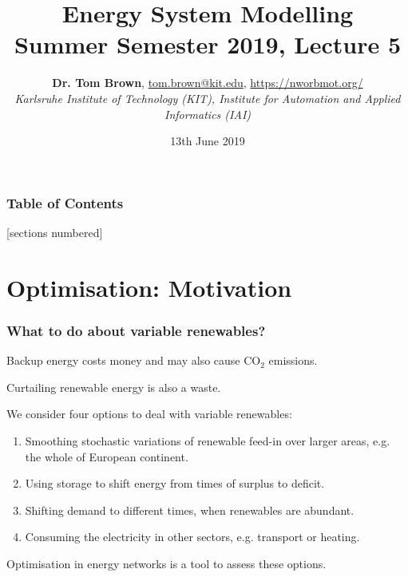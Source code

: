 \documentclass[10pt,aspectratio=169,dvipsnames]{beamer}
\title{Energy System Modelling\\ Summer Semester 2019, Lecture 5}
\author{
  {\bf Dr. Tom Brown}, \href{mailto:tom.brown@kit.edu}{tom.brown@kit.edu}, \url{https://nworbmot.org/}\\
  \emph{Karlsruhe Institute of Technology (KIT), Institute for Automation and Applied Informatics (IAI)}
}
\date{\vspace{.3cm}13th June 2019}
\let\olditem\item
\renewcommand{\item}{%
\olditem\vspace{5pt}}
\begin{document}
\maketitle


\begin{frame}

  \frametitle{Table of Contents}
  [sections numbered]
  \tableofcontents[hideallsubsections]
\end{frame}


\section{Optimisation: Motivation}



\begin{frame}
  \frametitle{What to do about variable renewables?}

  Backup energy costs money and may also cause CO${}_2$ emissions.

  Curtailing renewable energy is also a waste.

  We consider \alert{four options} to deal with variable renewables:
  \begin{enumerate}
  \item Smoothing stochastic variations of renewable feed-in over \alert{larger areas}, e.g. the whole of European continent.
  \item Using \alert{storage} to shift energy from times of surplus to deficit.
  \item \alert{Shifting demand} to different times, when renewables are abundant.
    \item Consuming the electricity in \alert{other sectors}, e.g. transport or heating.
  \end{enumerate}

\alert{Optimisation} in energy networks is a tool to assess these options.


\end{frame}
\end{document}
